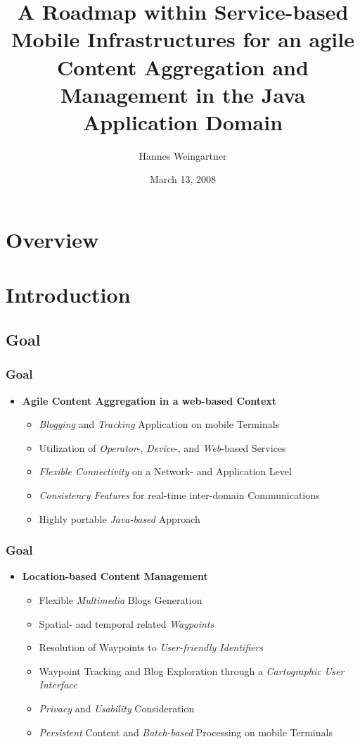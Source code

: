 \documentclass[blue]{beamer}
\title{A Roadmap within Service-based Mobile Infrastructures for an agile Content Aggregation and Management in the Java Application Domain}
\institute[TU Wien]{Media Informatics\\Technical University of Vienna}
\author{Hannes Weingartner}
\date{March 13, 2008}
\begin{document}
\frame{\titlepage}

\section*{Overview}
\frame{\tableofcontents}




\section{Introduction}
\subsection{Goal}
\frame
{
\frametitle{\textbf{Goal}}
\begin{itemize}
\item \textbf{Agile Content Aggregation in a web-based Context}
  \begin{itemize}
    \item \textit{Blogging} and \textit{Tracking} Application on mobile Terminals
    \item Utilization of \textit{Operator}-, \textit{Device}-, and \textit{Web}-based Services
    \item \textit{Flexible Connectivity} on a Network- and Application Level
    \item \textit{Consistency Features} for real-time inter-domain Communications
    \item Highly portable \textit{Java-based} Approach
  \end{itemize}
\end{itemize}
}

\frame
{
\frametitle{\textbf{Goal}}
\begin{itemize}
\item \textbf{Location-based Content Management}
  \begin{itemize}
    \item Flexible \textit{Multimedia} Blogs Generation
    \item Spatial- and temporal related \textit{Waypoints}
    \item Resolution of Waypoints to \textit{User-friendly Identifiers}
    \item Waypoint Tracking and Blog Exploration through a \textit{Cartographic User Interface}
    \item \textit{Privacy} and \textit{Usability} Consideration
    \item \textit{Persistent} Content and \textit{Batch-based} Processing on mobile Terminals
  \end{itemize}
\end{itemize}
}
\end{document}
